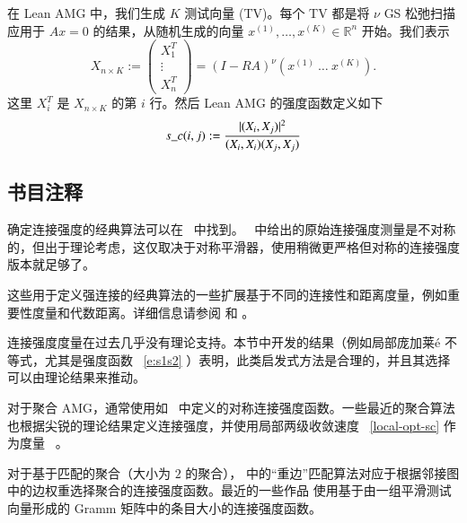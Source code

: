 \documentclass[12pt]{acta_2011xz}
\begin{document}
在 Lean AMG 中，我们生成    $K$    测试向量 (TV)。每个 TV 都是将    $\nu$    GS 松弛扫描应用于    $Ax=0$    的结果，从随机生成的向量    $x^{(1)}, \dots, x^{(K)}\in \mathbb R^n$    开始。我们表示 
   \begin{equation}
    X_{n\times K}:= \begin{pmatrix}
        X_1^T \\ 
        \vdots \\ 
        X_n^T
    \end{pmatrix}= (I-RA)^{\nu}
    \left(x^{(1)}~\dots~x^{(K)}\right).
\end{equation}    这里    $X_i^T$    是    $X_{n\times K}$    的第    $i$    行。然后 Lean AMG 的强度函数定义如下
   \begin{equation}\label{sc-Lean}
    s\_c(i,j):=\frac{|(X_i, X_j)|^2}{(X_i, X_i)(X_j, X_j)}
\end{equation}     

   \subsection{书目注释  }    确定连接强度的经典算法可以在~    \cite{1stAMG,Stuben.K.1983a,Brandt.A;McCormick.S;Ruge.J.1985a,Ruge.J;Stuben.K.1987a,Briggs.W;Henson.V;McCormick.S.2000a}    中找到。~    \cite{ruge5110final,mccormick1989algebraic,Brandt.A;McCormick.S;Ruge.J.1985a,ruge1983algebraic}    中给出的原始连接强度测量是不对称的，但出于理论考虑，这仅取决于对称平滑器，使用稍微更严格但对称的连接强度版本就足够了。  

这些用于定义强连接的经典算法的一些扩展基于不同的连接性和距离度量，例如重要性度量和代数距离。详细信息请参阅    \cite{Ruge.J;Stuben.K.1987a}    和    \cite[Appendix~A]{Trottenberg.U;Oosterlee.C;Schuller.A.2001a}   。  

连接强度度量在过去几乎没有理论支持。本节中开发的结果（例如局部庞加莱\'{e} 不等式，尤其是强度函数~   \eqref{e:s1s2}   ）表明，此类启发式方法是合理的，并且其选择可以由理论结果来推动。  

对于聚合 AMG，通常使用如~   \cite{1996VanekP_MandelJ_BrezinaM-aa}    中定义的对称连接强度函数。一些最近的聚合算法也根据尖锐的理论结果定义连接强度，并使用局部两级收敛速度~   \eqref{local-opt-sc}    作为度量~   \cite{Notay.Y.2010b,Napov.A;Notay.Y.2012a}   。  

对于基于匹配的聚合（大小为    $2$    的聚合），   \cite{Karypis.G;Kumar.V.1998a}    中的“重边”匹配算法对应于根据邻接图中的边权重选择聚合的连接强度函数。最近的一些作品    \cite{Livne.O;Brandt.A.2012a}    使用基于由一组平滑测试向量形成的 Gramm 矩阵中的条目大小的连接强度函数。  
\end{document}
